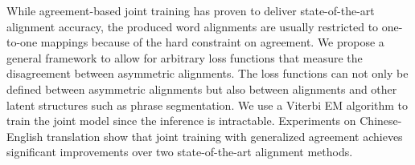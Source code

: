 While agreement-based joint training has proven to deliver state-of-the-art alignment accuracy, the produced word alignments are usually restricted to one-to-one mappings because of the hard constraint on agreement. We propose a general framework to allow for arbitrary loss functions that measure the disagreement between asymmetric alignments. The loss functions can not only be defined between asymmetric alignments but also between alignments and other latent structures such as phrase segmentation. We use a Viterbi EM algorithm to train the joint model since the inference is intractable. Experiments on Chinese-English translation show that joint training with generalized agreement achieves significant improvements over two state-of-the-art alignment methods.
